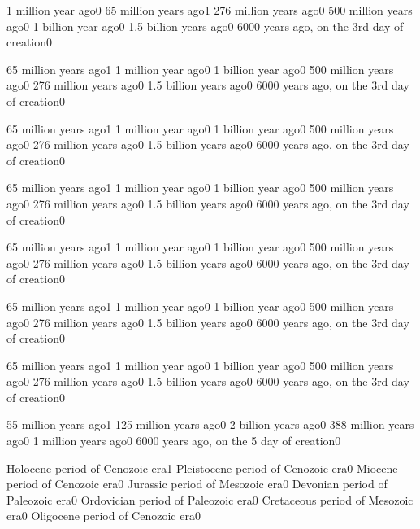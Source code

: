 {1 million year ago}{0}
{65 million years ago}{1}
{276 million years ago}{0}
{500 million years ago}{0}
{1 billion year ago}{0}
{1.5 billion years ago}{0}
{6000 years ago, on the 3rd day of creation}{0}
\qstop

{65 million years ago}{1}
{1 million year ago}{0}
{1 billion year ago}{0}
{500 million years ago}{0}
{276 million years ago}{0}
{1.5 billion years ago}{0}
{6000 years ago, on the 3rd day of creation}{0}
\qstop

{65 million years ago}{1}
{1 million year ago}{0}
{1 billion year ago}{0}
{500 million years ago}{0}
{276 million years ago}{0}
{1.5 billion years ago}{0}
{6000 years ago, on the 3rd day of creation}{0}
\qstop

{65 million years ago}{1}
{1 million year ago}{0}
{1 billion year ago}{0}
{500 million years ago}{0}
{276 million years ago}{0}
{1.5 billion years ago}{0}
{6000 years ago, on the 3rd day of creation}{0}
\qstop

{65 million years ago}{1}
{1 million year ago}{0}
{1 billion year ago}{0}
{500 million years ago}{0}
{276 million years ago}{0}
{1.5 billion years ago}{0}
{6000 years ago, on the 3rd day of creation}{0}
\qstop

{65 million years ago}{1}
{1 million year ago}{0}
{1 billion year ago}{0}
{500 million years ago}{0}
{276 million years ago}{0}
{1.5 billion years ago}{0}
{6000 years ago, on the 3rd day of creation}{0}
\qstop

{65 million years ago}{1}
{1 million year ago}{0}
{1 billion year ago}{0}
{500 million years ago}{0}
{276 million years ago}{0}
{1.5 billion years ago}{0}
{6000 years ago, on the 3rd day of creation}{0}
\qstop

{55 million years ago}{1}
{125 million years ago}{0}
{2 billion years ago}{0}
{388 million years ago}{0}
{1 million years ago}{0}
{6000 years ago, on the 5 day of creation}{0}
\qstop


{Holocene period of Cenozoic era}{1}
{Pleistocene period of Cenozoic era}{0}
{Miocene period of Cenozoic era}{0}
{Jurassic period of Mesozoic era}{0}
{Devonian period of Paleozoic era}{0}
{Ordovician period of Paleozoic era}{0}
{Cretaceous period of Mesozoic era}{0}
{Oligocene period of Cenozoic era}{0}
\qstop

